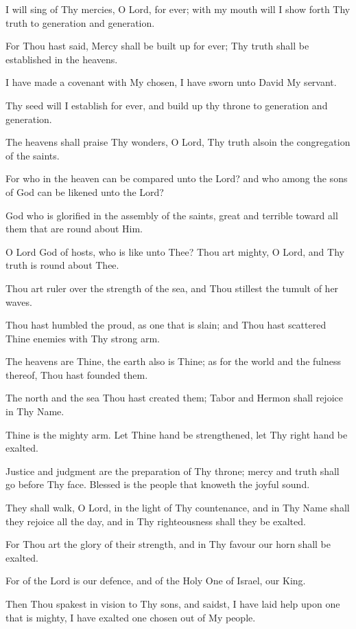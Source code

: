 I will sing of Thy mercies, O Lord, for ever; with my mouth will I show forth Thy truth to generation and generation.

For Thou hast said, Mercy shall be built up for ever; Thy truth shall be established in the heavens.

I have made a covenant with My chosen, I have sworn unto David My servant.

Thy seed will I establish for ever, and build up thy throne to generation and generation.

The heavens shall praise Thy wonders, O Lord, Thy truth alsoin the congregation of the saints.

For who in the heaven can be compared unto the Lord? and who among the sons of God can be likened unto the Lord?

God who is glorified in the assembly of the saints, great and terrible toward all them that are round about Him.

O Lord God of hosts, who is like unto Thee? Thou art mighty, O Lord, and Thy truth is round about Thee.

Thou art ruler over the strength of the sea, and Thou stillest the tumult of her waves.

Thou hast humbled the proud, as one that is slain; and Thou hast scattered Thine enemies with Thy strong arm.

The heavens are Thine, the earth also is Thine; as for the world and the fulness thereof, Thou hast founded them.

The north and the sea Thou hast created them; Tabor and Hermon shall rejoice in Thy Name.

Thine is the mighty arm. Let Thine hand be strengthened, let Thy right hand be exalted.

Justice and judgment are the preparation of Thy throne; mercy and truth shall go before Thy face. Blessed is the people that knoweth the joyful sound.

They shall walk, O Lord, in the light of Thy countenance, and in Thy Name shall they rejoice all the day, and in Thy righteousness shall they be exalted.

For Thou art the glory of their strength, and in Thy favour our horn shall be exalted.

For of the Lord is our defence, and of the Holy One of Israel, our King.

Then Thou spakest in vision to Thy sons, and saidst, I have laid help upon one that is mighty, I have exalted one chosen out of My people.

